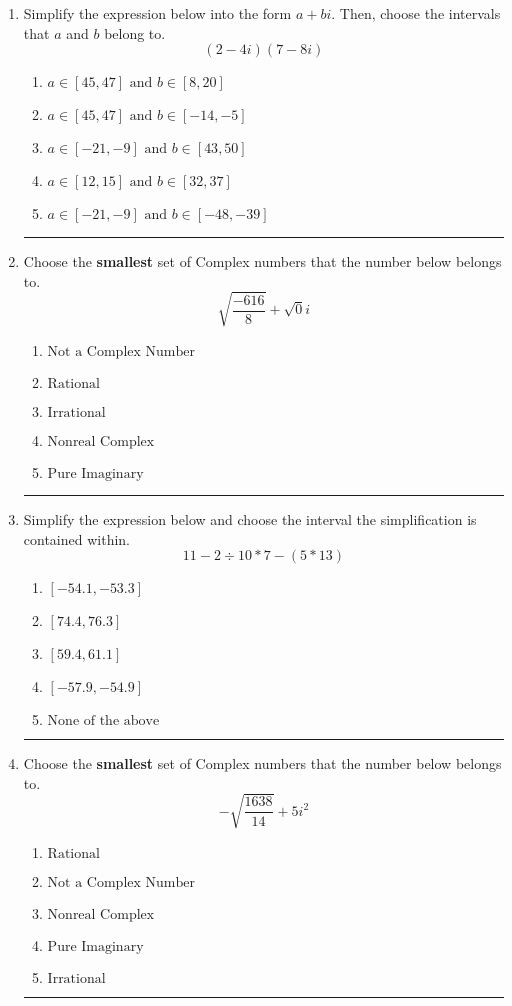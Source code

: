 \documentclass[14pt]{extbook}
\newcommand{\litem}[1]{\item#1\hspace*{-1cm}\rule{\textwidth}{0.4pt}}
\begin{document}
\begin{enumerate}
\litem{
Simplify the expression below into the form $a+bi$. Then, choose the intervals that $a$ and $b$ belong to.\[ (2 - 4 i)(7 - 8 i) \]\begin{enumerate}[label=\Alph*.]
\item \( a \in [45, 47] \text{ and } b \in [8, 20] \)
\item \( a \in [45, 47] \text{ and } b \in [-14, -5] \)
\item \( a \in [-21, -9] \text{ and } b \in [43, 50] \)
\item \( a \in [12, 15] \text{ and } b \in [32, 37] \)
\item \( a \in [-21, -9] \text{ and } b \in [-48, -39] \)

\end{enumerate} }
\litem{
Choose the \textbf{smallest} set of Complex numbers that the number below belongs to.\[ \sqrt{\frac{-616}{8}}+\sqrt{0}i \]\begin{enumerate}[label=\Alph*.]
\item \( \text{Not a Complex Number} \)
\item \( \text{Rational} \)
\item \( \text{Irrational} \)
\item \( \text{Nonreal Complex} \)
\item \( \text{Pure Imaginary} \)

\end{enumerate} }
\litem{
Simplify the expression below and choose the interval the simplification is contained within.\[ 11 - 2 \div 10 * 7 - (5 * 13) \]\begin{enumerate}[label=\Alph*.]
\item \( [-54.1, -53.3] \)
\item \( [74.4, 76.3] \)
\item \( [59.4, 61.1] \)
\item \( [-57.9, -54.9] \)
\item \( \text{None of the above} \)

\end{enumerate} }
\litem{
Choose the \textbf{smallest} set of Complex numbers that the number below belongs to.\[ -\sqrt{\frac{1638}{14}}+5i^2 \]\begin{enumerate}[label=\Alph*.]
\item \( \text{Rational} \)
\item \( \text{Not a Complex Number} \)
\item \( \text{Nonreal Complex} \)
\item \( \text{Pure Imaginary} \)
\item \( \text{Irrational} \)


\end{enumerate}}
\end{enumerate}
\end{document}
